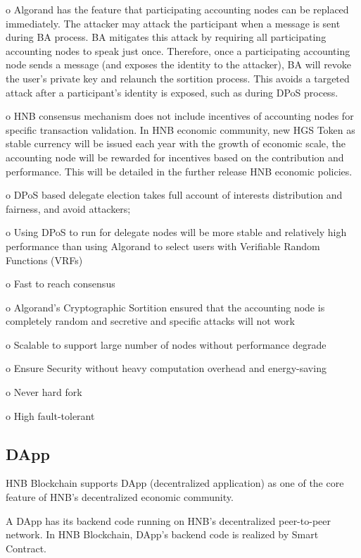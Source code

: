 \documentclass[fleqn,10pt]{SelfArx} %
\begin{document}
o	Algorand has the feature that participating accounting nodes can be replaced immediately. The attacker may attack the participant when a message is sent during BA process. BA mitigates this attack by requiring all participating accounting nodes to speak just once. Therefore, once a participating accounting node sends a message (and exposes the identity to the attacker), BA will revoke the user's private key and relaunch the sortition process. This avoids a targeted attack after a participant's identity is exposed, such as during DPoS process.

o	HNB consensus mechanism does not include incentives of accounting nodes for specific transaction validation. In HNB economic community, new HGS Token as stable currency will be issued each year with the growth of economic scale, the accounting node will be rewarded for incentives based on the contribution and performance. This will be detailed in the further release HNB economic policies. \\


o	DPoS based delegate election takes full account of interests distribution and fairness, and avoid attackers; 

o	Using DPoS to run for delegate nodes will be more stable and relatively high performance than using Algorand to select users with Verifiable Random Functions (VRFs)

o	Fast to reach consensus

o	Algorand’s Cryptographic Sortition ensured that the accounting node is completely random and secretive and specific attacks will not work

o	Scalable to support large number of nodes without performance degrade

o	Ensure Security without heavy computation overhead and energy-saving  

o	Never hard fork

o	High fault-tolerant\\

\subsection{DApp}


HNB Blockchain supports DApp (decentralized application) as one of the core feature of HNB's decentralized economic community.

A DApp has its backend code running on HNB's decentralized peer-to-peer network. In HNB Blockchain, DApp's backend code is realized by Smart Contract. 
\end{document}
